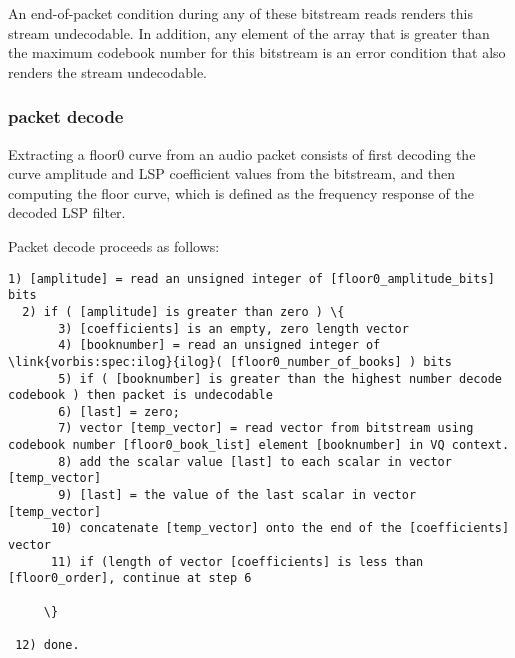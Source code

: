 An end-of-packet condition during any of these bitstream reads renders
this stream undecodable.  In addition, any element of the array
 that is greater than the maximum codebook
number for this bitstream is an error condition that also renders the
stream undecodable.



\subsubsection{packet decode} \label{vorbis:spec:floor0-decode}

Extracting a floor0 curve from an audio packet consists of first
decoding the curve amplitude and  LSP
coefficient values from the bitstream, and then computing the floor
curve, which is defined as the frequency response of the decoded LSP
filter.

Packet decode proceeds as follows:
\begin{Verbatim}[commandchars=\\\{\}]
  1) [amplitude] = read an unsigned integer of [floor0_amplitude_bits] bits
  2) if ( [amplitude] is greater than zero ) \{
       3) [coefficients] is an empty, zero length vector
       4) [booknumber] = read an unsigned integer of \link{vorbis:spec:ilog}{ilog}( [floor0_number_of_books] ) bits
       5) if ( [booknumber] is greater than the highest number decode codebook ) then packet is undecodable
       6) [last] = zero;
       7) vector [temp_vector] = read vector from bitstream using codebook number [floor0_book_list] element [booknumber] in VQ context.
       8) add the scalar value [last] to each scalar in vector [temp_vector]
       9) [last] = the value of the last scalar in vector [temp_vector]
      10) concatenate [temp_vector] onto the end of the [coefficients] vector
      11) if (length of vector [coefficients] is less than [floor0_order], continue at step 6

     \}

 12) done.

\end{Verbatim}

